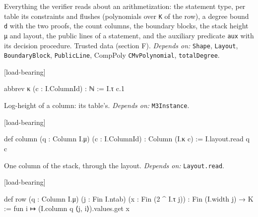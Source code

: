 
Everything the verifier reads about an arithmetization: the statement type, per table its constraints and flushes (polynomials over \texttt{K} of the row), a degree bound \texttt{d} with the two proofs, the count columns, the boundary blocks, the stack height \texttt{μ} and layout, the public lines of a statement, and the auxiliary predicate \texttt{aux} with its decision procedure. Trusted data (section F). \emph{Depends on:} \texttt{Shape}, \texttt{Layout}, \texttt{BoundaryBlock}, \texttt{PublicLine}, CompPoly \texttt{CMvPolynomial}, \texttt{totalDegree}.

\par\medskip\noindent\textbf{}\hfill\textsf{\small [load-bearing]}\par\nopagebreak

\begin{leancode}
abbrev κ (c : I.ColumnId) : ℕ := I.τ c.1
\end{leancode}


Log-height of a column: its table's. \emph{Depends on:} \texttt{M3Instance}.

\par\medskip\noindent\textbf{}\hfill\textsf{\small [load-bearing]}\par\nopagebreak

\begin{leancode}
def column (q : Column I.μ) (c : I.ColumnId) : Column (I.κ c) := I.layout.read q c
\end{leancode}


One column of the stack, through the layout. \emph{Depends on:} \texttt{Layout.\allowbreak{}read}.

\par\medskip\noindent\textbf{}\hfill\textsf{\small [load-bearing]}\par\nopagebreak

\begin{leancode}
def row (q : Column I.μ) (j : Fin I.ntab) (x : Fin (2 ^ I.τ j)) : Fin (I.width j) → K :=
  fun i ↦ (I.column q ⟨j, i⟩).values.get x
\end{leancode}


